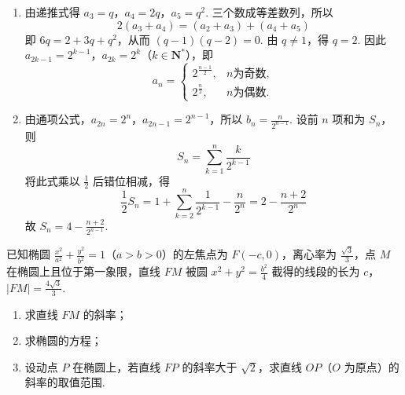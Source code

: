 \begin{solution}
\begin{enumerate}
\item 由递推式得 \(a_3=q\)，\(a_4=2q\)，\(a_5=q^2\). 三个数成等差数列，所以
\[
2(a_3+a_4)=(a_2+a_3)+(a_4+a_5)
\]
即 \(6q=2+3q+q^2\)，从而 \((q-1)(q-2)=0\). 由 \(q\ne1\)，得 \(q=2\). 因此
\(a_{2k-1}=2^{k-1}\)，\(a_{2k}=2^k\)（\(k\in\mathbf N^*\)），即
\[
a_n=\begin{cases}
2^{\frac{n-1}{2}},&n\text{为奇数},\\
2^{\frac n2},&n\text{为偶数}.
\end{cases}
\]
\item 由通项公式，\(a_{2n}=2^n\)，\(a_{2n-1}=2^{n-1}\)，所以 \(b_n=\frac{n}{2^{n-1}}\). 设前 \(n\) 项和为 \(S_n\)，则
\[
S_n=\sum_{k=1}^n\frac{k}{2^{k-1}}
\]
将此式乘以 \(\frac12\) 后错位相减，得
\[
\frac12S_n=1+\sum_{k=2}^{n}\frac{1}{2^{k-1}}-\frac{n}{2^n}
 =2-\frac{n+2}{2^n}
\]
故 \(S_n=4-\frac{n+2}{2^{n-1}}\).
\end{enumerate}
\end{solution}

\begin{problem}
已知椭圆 \(\frac{x^2}{a^2} + \frac{y^2}{b^2} = 1\)（\(a > b > 0\)）的左焦点为 \(F(-c, 0)\)，离心率为 \(\frac{\sqrt{3}}{3}\)，点 \(M\) 在椭圆上且位于第一象限，直线 \(FM\) 被圆 \(x^2 + y^2 = \frac{b^2}{4}\) 截得的线段的长为 \(c\)，\(|FM| = \frac{4\sqrt{3}}{3}\).

\begin{enumerate}
\item 求直线 \(FM\) 的斜率；
\item 求椭圆的方程；
\item 设动点 \(P\) 在椭圆上，若直线 \(FP\) 的斜率大于 \(\sqrt{2}\)，求直线 \(OP\)（\(O\) 为原点）的斜率的取值范围.
\end{enumerate}
\end{problem}

